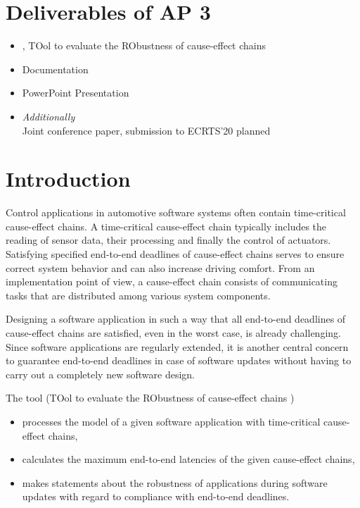 \section{Deliverables of AP 3}
\begin{itemize}
	\item \Tool, TOol to evaluate the RObustness of cause-effect chains
	\item Documentation
	\item PowerPoint Presentation
	\item \emph{Additionally}\\
	Joint conference paper, submission to ECRTS'20 planned
\end{itemize}

\newpage

\section{Introduction}
Control applications in automotive software systems often contain time-critical cause-effect chains.  
A time-critical cause-effect chain typically includes the reading of sensor data, their processing and finally the control of actuators.  
Satisfying specified end-to-end deadlines of cause-effect  chains serves to ensure correct system behavior and can also increase driving comfort.
From an implementation point of view, a cause-effect chain consists of communicating tasks that are distributed among various system components. 
\smallskip

Designing a software application in such a way that all end-to-end deadlines of cause-effect chains are satisfied, even in the worst case, is already challenging. 
Since software applications are regularly extended, it is another central concern to guarantee end-to-end deadlines in case of software updates without having to carry out a completely new software design. 


The tool \Tool (TOol to evaluate the RObustness of cause-effect chains )
\begin{itemize}
	\item processes the model of a given software application with time-critical cause-effect chains,
	\item calculates the maximum end-to-end latencies of the given cause-effect chains,
	\item makes statements about the robustness of applications during software updates with regard to compliance with end-to-end deadlines.
\end{itemize}
\bigskip

